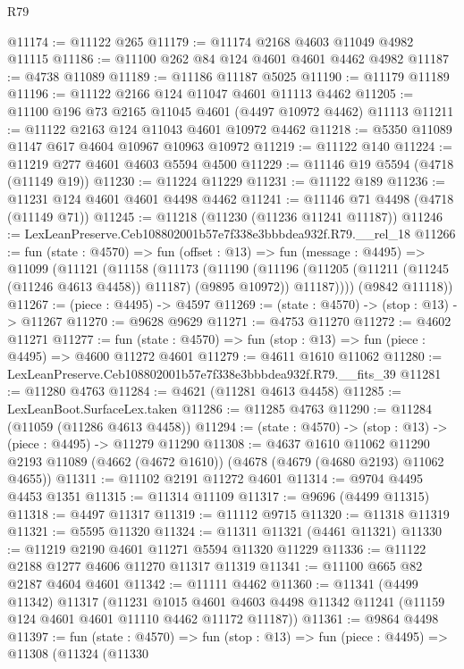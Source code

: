 \begin{lexlean}{R79}
\begin{coremodule}
@11174 := @11122 @265
@11179 := @11174 @2168 @4603 @11049 @4982 @11115
@11186 := @11100 @262 @84 @124 @4601 @4601 @4462 @4982
@11187 := @4738 @11089
@11189 := @11186 @11187 @5025
@11190 := @11179 @11189
@11196 := @11122 @2166 @124 @11047 @4601 @11113 @4462
@11205 := @11100 @196 @73 @2165 @11045 @4601 (@4497 @10972 @4462) @11113
@11211 := @11122 @2163 @124 @11043 @4601 @10972 @4462
@11218 := @5350 @11089 @1147 @617 @4604 @10967 @10963 @10972
@11219 := @11122 @140
@11224 := @11219 @277 @4601 @4603 @5594 @4500
@11229 := @11146 @19 @5594 (@4718 (@11149 @19))
@11230 := @11224 @11229
@11231 := @11122 @189
@11236 := @11231 @124 @4601 @4601 @4498 @4462
@11241 := @11146 @71 @4498 (@4718 (@11149 @71))
@11245 := @11218 (@11230 (@11236 @11241 @11187))
@11246 := LexLeanPreserve.Ceb108802001b57e7f338e3bbbdea932f.R79.__rel_18
@11266 := fun (state : @4570) =>
  fun (offset : @13) =>
  fun (message : @4495) =>
  @11099
    (@11121
      (@11158
        (@11173
          (@11190
            (@11196 (@11205 (@11211 (@11245 (@11246 @4613 @4458)) @11187) (@9895 @10972)) @11187))))
      (@9842 @11118))
@11267 := (piece : @4495) -> @4597
@11269 := (state : @4570) -> (stop : @13) -> @11267
@11270 := @9628 @9629
@11271 := @4753 @11270
@11272 := @4602 @11271
@11277 := fun (state : @4570) => fun (stop : @13) => fun (piece : @4495) => @4600 @11272 @4601
@11279 := @4611 @1610 @11062
@11280 := LexLeanPreserve.Ceb108802001b57e7f338e3bbbdea932f.R79.__fits_39
@11281 := @11280 @4763
@11284 := @4621 (@11281 @4613 @4458)
@11285 := LexLeanBoot.SurfaceLex.taken
@11286 := @11285 @4763
@11290 := @11284 (@11059 (@11286 @4613 @4458))
@11294 := (state : @4570) -> (stop : @13) -> (piece : @4495) -> @11279 @11290
@11308 := @4637
    @1610
    @11062
    @11290
    @2193
    @11089
    (@4662 (@4672 @1610))
    (@4678 (@4679 (@4680 @2193) @11062 @4655))
@11311 := @11102 @2191 @11272 @4601
@11314 := @9704 @4495 @4453 @1351
@11315 := @11314 @11109
@11317 := @9696 (@4499 @11315)
@11318 := @4497 @11317
@11319 := @11112 @9715
@11320 := @11318 @11319
@11321 := @5595 @11320
@11324 := @11311 @11321 (@4461 @11321)
@11330 := @11219 @2190 @4601 @11271 @5594 @11320 @11229
@11336 := @11122 @2188 @1277 @4606 @11270 @11317 @11319
@11341 := @11100 @665 @82 @2187 @4604 @4601
@11342 := @11111 @4462
@11360 := @11341
    (@4499 @11342)
    @11317
    (@11231
      @1015
      @4601
      @4603
      @4498
      @11342
      @11241
      (@11159 @124 @4601 @4601 @11110 @4462 @11172 @11187))
@11361 := @9864 @4498
@11397 := fun (state : @4570) =>
  fun (stop : @13) =>
  fun (piece : @4495) =>
  @11308
    (@11324
      (@11330

\end{coremodule}
\end{lexlean}
